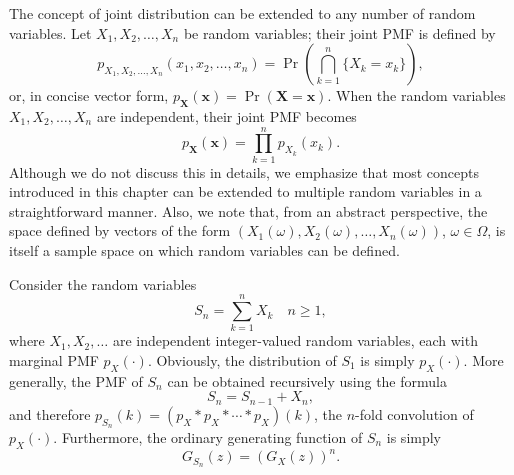 The concept of joint distribution can be extended to any number of random variables.
Let $X_1, X_2, \ldots, X_n$ be random variables; their joint PMF is defined by
\begin{equation*}
p_{X_1, X_2, \ldots, X_n} (x_1, x_2, \ldots, x_n) = \Pr \left( \bigcap_{k=1}^n \{ X_k = x_k \} \right),
\end{equation*}
or, in concise vector form, $p_{\mathbf{X}} (\mathbf{x}) = \Pr ( \mathbf{X} = \mathbf{x} )$.
When the random variables $X_1, X_2, \ldots, X_n$ are independent, their joint PMF becomes
\begin{equation*}
p_{\mathbf{X}} (\mathbf{x}) = \prod_{k=1}^n p_{X_k} (x_k) .
\end{equation*}
Although we do not discuss this in details, we emphasize that most concepts introduced in this chapter can be extended to multiple random variables in a straightforward manner.
Also, we note that, from an abstract perspective, the space defined by vectors of the form $( X_1 (\omega), X_2 (\omega), \ldots, X_n (\omega) )$, $\omega \in \Omega$, is itself a sample space on which random variables can be defined.

Consider the random variables
\begin{equation*}
S_n = \sum_{k=1}^n X_k \quad n \geq 1 ,
\end{equation*}
where $X_1, X_2, \ldots$ are independent integer-valued random variables, each with marginal PMF $p_X (\cdot)$.
Obviously, the distribution of $S_1$ is simply $p_X (\cdot)$.
More generally, the PMF of $S_n$ can be obtained recursively using the formula
\begin{equation*}
S_n = S_{n-1} + X_n ,
\end{equation*}
and therefore $p_{S_n} (k) = (p_X \ast p_X \ast \cdots \ast p_X ) (k)$, the $n$-fold convolution of $p_X (\cdot)$.
Furthermore, the ordinary generating function of $S_n$ is simply
\begin{equation*}
G_{S_n} (z) = \left( G_X (z) \right)^n.
\end{equation*}

